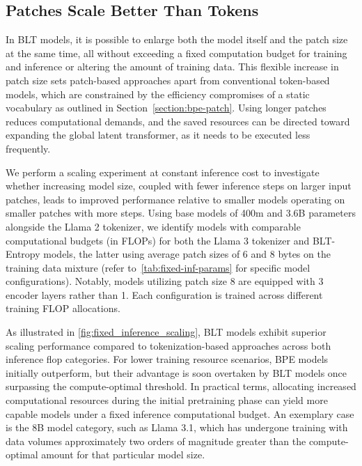 \subsection{Patches Scale Better Than Tokens} In {\textsc BLT} models, it is possible to enlarge both the model itself and the patch size at the same time, all without exceeding a fixed computation budget for training and inference or altering the amount of training data. This flexible increase in patch size sets patch-based approaches apart from conventional token-based models, which are constrained by the efficiency compromises of a static vocabulary as outlined in Section~\ref{section:bpe-patch}. Using longer patches reduces computational demands, and the saved resources can be directed toward expanding the global latent transformer, as it needs to be executed less frequently.

We perform a scaling experiment at constant inference cost to investigate whether increasing model size, coupled with fewer inference steps on larger input patches, leads to improved performance relative to smaller models operating on smaller patches with more steps. Using base models of 400m and 3.6B parameters alongside the Llama 2 tokenizer, we identify models with comparable computational budgets (in FLOPs) for both the Llama 3 tokenizer and {\textsc BLT}-Entropy models, the latter using average patch sizes of 6 and 8 bytes on the training data mixture (refer to~\autoref{tab:fixed-inf-params} for specific model configurations). Notably, models utilizing patch size 8 are equipped with 3 encoder layers rather than 1. Each configuration is trained across different training FLOP allocations.

As illustrated in \autoref{fig:fixed_inference_scaling}, {\textsc BLT} models exhibit superior scaling performance compared to tokenization-based approaches across both inference flop categories. For lower training resource scenarios, BPE models initially outperform, but their advantage is soon overtaken by {\textsc BLT} models once surpassing the compute-optimal threshold. In practical terms, allocating increased computational resources during the initial pretraining phase can yield more capable models under a fixed inference computational budget. An exemplary case is the 8B model category, such as Llama 3.1, which has undergone training with data volumes approximately two orders of magnitude greater than the compute-optimal amount for that particular model size.

